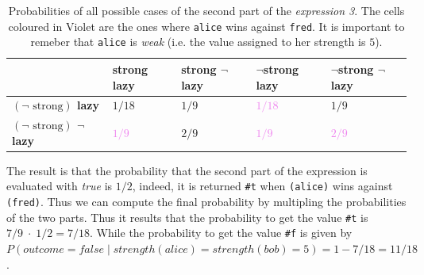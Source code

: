 \begin{itemize}
        \begin{table}[H]
            \centering
            \bgroup
                \def\arraystretch{1.5}
                \begin{tabular}{| l | C{1.8cm} C{1.8cm} C{1.8cm} C{1.8cm}  |}                    
                    \hline
                     & 
                        \textbf{strong lazy} & \textbf{strong $\neg$lazy} & \textbf{$\neg$strong lazy} & \textbf{$\neg$strong $\neg$lazy} \\
                    \hline

                    \textbf{$\left(\neg\text{ strong}\right)$ lazy} & \textcolor{RedOrange}{$1/18$} & \textcolor{RedOrange}{$1/9$} & 
                        \textcolor{Violet}{$1/18$} & \textcolor{RedOrange}{$1/9$} \\ 

                    \textbf{$\left(\neg\text{ strong}\right)$ $\neg$lazy} & \textcolor{Violet}{$1/9$} & \textcolor{RedOrange}{$2/9$} & 
                        \textcolor{Violet}{$1/9$} & \textcolor{Violet}{$2/9$} \\

                    \hline
                \end{tabular}
            \egroup
            \caption{
                Probabilities of all possible cases of the second part of the \textit{expression 3}. 
                The cells coloured in Violet are the ones where \texttt{\textquotesingle alice} wins against \texttt{\textquotesingle fred}.
                It is important to remeber that \texttt{\textquotesingle alice} is \textit{weak} (i.e. the value assigned to her strength is $5$).
            }
            \label{tab:exp-3}
        \end{table}

        The result is that the probability that the second part of the expression is evaluated with \textit{true} is $1/2$, indeed,
        it is returned \texttt{\#t} when \texttt{\textquotesingle (alice)} wins against \texttt{\textquotesingle (fred)}. Thus we can compute the final probability
        by multipling the probabilities of the two parts. Thus it results that the probability to get the value \texttt{\#t} is
        $7/9\;\cdot\;1/2 = 7/18$. While the probability to get the value \texttt{\#f} is given by 
        $P(outcome = false\;|\;strength(alice) = strength(bob) = 5) = 1 - 7/18 = 11/18$.
        

\end{itemize}
